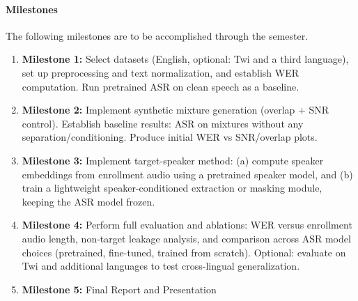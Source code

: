 \documentclass[11pt,a4paper,BCOR12mm, headexclude, footexclude, openright]{scrartcl}
\numberwithin{equation}{section}
\numberwithin{figure}{section}
\numberwithin{table}{section}
\begin{document}
\paragraph*{Milestones}
The following milestones are to be accomplished through the semester.
\begin{enumerate}
    \item \textbf{Milestone 1:} Select datasets (English, optional: Twi and a third language), set up preprocessing and text normalization, and establish WER computation. Run pretrained ASR on clean speech as a baseline.
    \item \textbf{Milestone 2:} Implement synthetic mixture generation (overlap + SNR control). Establish baseline results: ASR on mixtures without any separation/conditioning. Produce initial WER vs SNR/overlap plots.
    \item \textbf{Milestone 3:} Implement target-speaker method:
    (a) compute speaker embeddings from enrollment audio using a pretrained speaker model, and
    (b) train a lightweight speaker-conditioned extraction or masking module, keeping the ASR model frozen.
    \item \textbf{Milestone 4:} Perform full evaluation and ablations: WER versus enrollment audio length, non-target leakage analysis, and comparison across ASR model choices (pretrained, fine-tuned, trained from scratch). Optional: evaluate on Twi and additional languages to test cross-lingual generalization.

    \item \textbf{Milestone 5:} Final Report and Presentation

\end{enumerate}


	
\end{document}
